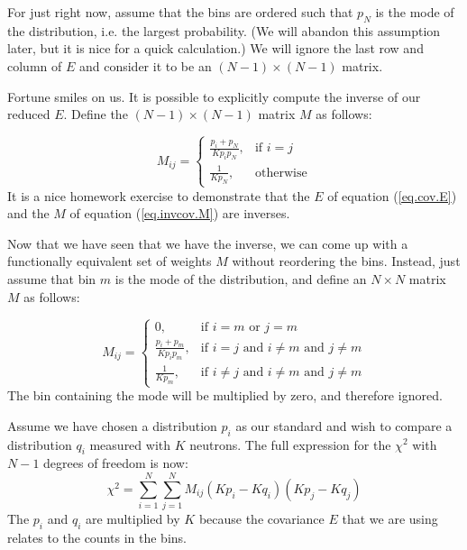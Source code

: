 \documentclass[letterpaper,12pt]{article}
\newcommand{\myMatrix}[1]{\bm{\mathit{#1}}}
\begin{document}
For just right now, assume that the bins are ordered such that $p_N$ is the mode of the distribution, i.e. the largest probability. (We will abandon this assumption later, but it is nice for a quick calculation.) We will ignore the last row and column of $\myMatrix{E}$ and consider it to be an $(N-1) \times (N-1)$ matrix.

Fortune smiles on us. It is possible to explicitly compute the inverse of our reduced $\myMatrix{E}$. Define the $(N-1) \times (N-1)$ matrix $\myMatrix{M}$ as follows:

\begin{equation} \label{eq.invcov.M}
	\myMatrix{M}_{ij}=
	\begin{cases}
		\frac{p_i+p_N}{Kp_ip_N}, & \text{if } i=j \\
		\frac{1}{Kp_N},  & \text{otherwise}
	\end{cases}
\end{equation}
It is a nice homework exercise to demonstrate that the $\myMatrix{E}$ of equation (\ref{eq.cov.E}) and the $\myMatrix{M}$ of equation (\ref{eq.invcov.M}) are inverses.

Now that we have seen that we have the inverse, we can come up with a functionally equivalent set of weights $\myMatrix{M}$ without reordering the bins. Instead, just assume that bin $m$ is the mode of the distribution, and define an $N \times N$ matrix $\myMatrix{M}$ as follows:

\begin{equation} \label{eq.invcov.M}
	\myMatrix{M}_{ij}=
	\begin{cases}
		0, & \text{if }i=m\text{ or }j=m \\
		\frac{p_i+p_m}{Kp_ip_m}, & \text{if }i=j\text{ and }i\ne m\text{ and }j\ne m \\
		\frac{1}{Kp_m},  & \text{if }i\ne j\text{ and }i\ne m\text{ and }j\ne m
	\end{cases}
\end{equation}
The bin containing the mode will be multiplied by zero, and therefore ignored.

Assume we have chosen a distribution $p_i$ as our standard and wish to compare a distribution $q_i$ measured with $K$ neutrons. The full expression for the $\chi^2$ with $N-1$ degrees of freedom is now:
\begin{equation} \label{eq.dist.chi.square.full}
\chi^2=\sum_{i=1}^N \sum_{j=1}^N \myMatrix{M}_{ij}(Kp_i - Kq_i)(Kp_j - Kq_j)
\end{equation}
The $p_i$ and $q_i$ are multiplied by $K$ because the covariance $\myMatrix{E}$ that we are using relates to the counts in the bins.
\end{document}
